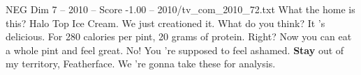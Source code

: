 \begin{textsample}{NEG Dim 7 – 2010 – Score -1.00 – 2010/tv\_com\_2010\_72.txt}  \label{ex:f7_neg_027}
What the home is this?
Halo Top Ice Cream.
We just creationed it.
What do you think?
It 's delicious.
For 280 calories per pint, 20 grams of protein.
Right?
Now you can eat a whole pint and feel great.
No!
You 're supposed to feel ashamed. \textbf{Stay} out of my territory, Featherface.
We 're gonna take these for analysis.

\end{textsample}
